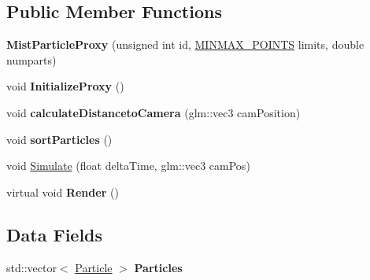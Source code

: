 \subsection*{Public Member Functions}
\begin{DoxyCompactItemize}
\item 
{\bfseries Mist\+Particle\+Proxy} (unsigned int id, \hyperlink{struct_m_i_n_m_a_x___p_o_i_n_t_s}{M\+I\+N\+M\+A\+X\+\_\+\+P\+O\+I\+N\+TS} limits, double numparts)\hypertarget{class_mist_particle_proxy_adb84b823fcd64a6a3a3bdaa8833e68cb}{}\label{class_mist_particle_proxy_adb84b823fcd64a6a3a3bdaa8833e68cb}

\item 
void {\bfseries Initialize\+Proxy} ()\hypertarget{class_mist_particle_proxy_a4ba586d08ef166a3eec6c23b8605599b}{}\label{class_mist_particle_proxy_a4ba586d08ef166a3eec6c23b8605599b}

\item 
void {\bfseries calculate\+Distanceto\+Camera} (glm\+::vec3 cam\+Position)\hypertarget{class_mist_particle_proxy_a264a8aac29e5ad62d669ca0a1074ddf2}{}\label{class_mist_particle_proxy_a264a8aac29e5ad62d669ca0a1074ddf2}

\item 
void {\bfseries sort\+Particles} ()\hypertarget{class_mist_particle_proxy_aa3f5e08275cfe68c240ef9a0cef91646}{}\label{class_mist_particle_proxy_aa3f5e08275cfe68c240ef9a0cef91646}

\item 
void \hyperlink{class_mist_particle_proxy_a5187e0417b1e07706325ca56f7173822}{Simulate} (float delta\+Time, glm\+::vec3 cam\+Pos)
\item 
virtual void {\bfseries Render} ()\hypertarget{class_mist_particle_proxy_af90afa793b42b68c3402ffba593c1aae}{}\label{class_mist_particle_proxy_af90afa793b42b68c3402ffba593c1aae}

\end{DoxyCompactItemize}
\subsection*{Data Fields}
\begin{DoxyCompactItemize}
\item 
std\+::vector$<$ \hyperlink{class_particle}{Particle} $>$ {\bfseries Particles}\hypertarget{class_mist_particle_proxy_a6205747277240f264febfef07dbc0c5d}{}\label{class_mist_particle_proxy_a6205747277240f264febfef07dbc0c5d}

\end{DoxyCompactItemize}
